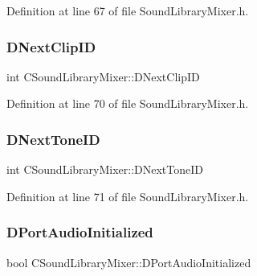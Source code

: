 Definition at line 67 of file Sound\+Library\+Mixer.\+h.

\hypertarget{classCSoundLibraryMixer_a9bbd8e4d0945a06cdb3b21aa05ddeb60}{}\label{classCSoundLibraryMixer_a9bbd8e4d0945a06cdb3b21aa05ddeb60} 
\subsubsection{\texorpdfstring{D\+Next\+Clip\+ID}{DNextClipID}}
{\footnotesize\ttfamily int C\+Sound\+Library\+Mixer\+::\+D\+Next\+Clip\+ID\hspace{0.3cm}{\ttfamily [protected]}}



Definition at line 70 of file Sound\+Library\+Mixer.\+h.

\hypertarget{classCSoundLibraryMixer_a88efc1ea710744bceadccf66967f9736}{}\label{classCSoundLibraryMixer_a88efc1ea710744bceadccf66967f9736} 
\subsubsection{\texorpdfstring{D\+Next\+Tone\+ID}{DNextToneID}}
{\footnotesize\ttfamily int C\+Sound\+Library\+Mixer\+::\+D\+Next\+Tone\+ID\hspace{0.3cm}{\ttfamily [protected]}}



Definition at line 71 of file Sound\+Library\+Mixer.\+h.

\hypertarget{classCSoundLibraryMixer_a1c78419f5e6cfdf4bc879bb5eedf52f0}{}\label{classCSoundLibraryMixer_a1c78419f5e6cfdf4bc879bb5eedf52f0} 
\subsubsection{\texorpdfstring{D\+Port\+Audio\+Initialized}{DPortAudioInitialized}}
{\footnotesize\ttfamily bool C\+Sound\+Library\+Mixer\+::\+D\+Port\+Audio\+Initialized\hspace{0.3cm}{\ttfamily [protected]}}



